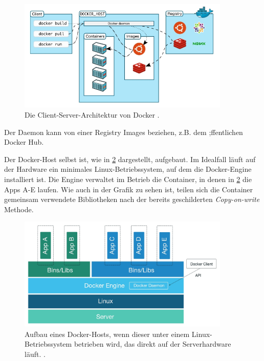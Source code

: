 \documentclass[../main.tex]{subfiles}
\begin{document}
      \begin{figure}[h]
          \centering
          \includegraphics[width=0.9\textwidth]{./images/intro_dockerArchitecture.jpg}
          \caption{Die Client-Server-Architektur von Docker \cite{dockerUnderstandingDocker}.}
          \label{fig:intro_dockerArchitecture}
      \end{figure}

      Der Daemon kann von einer Registry Images beziehen, z.B. dem ;ffentlichen Docker Hub.

      Der Docker-Host selbst ist, wie in \fig \ref{fig:intro_dockerHost} dargestellt, aufgebaut. Im Idealfall läuft auf der Hardware ein minimales Linux-Betriebssystem, auf dem die Docker-Engine installiert ist. Die Engine verwaltet im Betrieb die Container, in denen in \fig \ref{fig:intro_dockerHost} die Apps A-E laufen. Wie auch in der Grafik zu sehen ist, teilen sich die Container gemeinsam verwendete Bibliotheken nach der bereits geschilderten \emph{Copy-on-write} Methode.

      \begin{figure}[h]
          \centering
          \includegraphics[width=0.9\textwidth]{./images/intro_dockerHost.jpg}
          \caption{Aufbau eines Docker-Hosts, wenn dieser unter einem Linux-Betriebssystem betrieben wird, das direkt auf der Serverhardware läuft. \cite[S.3]{dockerSecIntro}.}
          \label{fig:intro_dockerHost}
      \end{figure}
\end{document}

